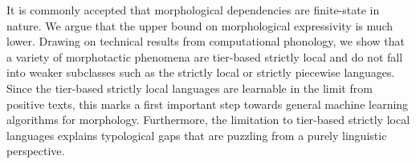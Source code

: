 It is commonly accepted that morphological dependencies are finite-state in nature. We argue that the upper bound on morphological expressivity is much lower. Drawing on technical results from computational phonology, we show that a variety of morphotactic phenomena are tier-based strictly local and do not fall into weaker subclasses such as the strictly local or strictly piecewise languages. Since the tier-based strictly local languages are learnable in the limit from positive texts, this marks a first important step towards general machine learning algorithms for morphology. Furthermore, the limitation to tier-based strictly local languages explains typological gaps that are puzzling from a purely linguistic perspective.
